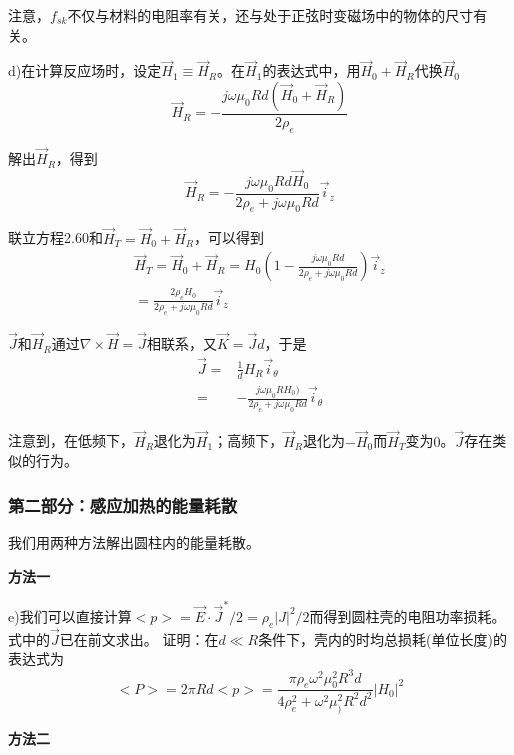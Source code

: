 注意，$f_{sk}$不仅与材料的电阻率有关，还与处于正弦时变磁场中的物体的尺寸有关。

d)在计算反应场时，设定$\vec{H}_1\equiv \vec{H}_R$。在$\vec{H}_1$的表达式中，用$\vec{H}_0+\vec{H}_R$代换$\vec{H}_0$
\begin{equation*}
\vec{H}_R=-\frac{j\omega \mu_0 R d (\vec{H}_0+\vec{H}_R)}{2\rho_e} \tag{S7.7}
\end{equation*}

解出$\vec{H}_R$，得到
\begin{equation*}
\vec{H}_R=-\frac{j\omega \mu_0 R d \vec{H}_0}{2\rho_e+j\omega \mu_0 R d}\vec{i}_z \tag{2.60}
\end{equation*}

联立方程2.60和$\vec{H}_T=\vec{H}_0+\vec{H}_R$，可以得到
\begin{align}
\vec{H}_T=\vec{H}_0+\vec{H}_R=H_0\left(1-\frac{j\omega\mu_0 R d}{2\rho_e+j\omega\mu_0 Rd}\right)\vec{i}_z\nonumber\\
=\frac{2\rho_e H_0}{2\rho_e+j\omega \mu_0 R d}\vec{i}_z\nonumber\tag{2.61}
\end{align}

$\vec{J}$和$\vec{H}_R$通过$\nabla\times \vec{H}=\vec{J}$相联系，又$\vec{K}=\vec{J}d$，于是
\begin{align}
\vec{J}=&\frac{1}{d}H_R \vec{i}_\theta \nonumber\tag{S7.8}\\
=&-\frac{j\omega \mu_0 R H_0)}{2\rho_e+j\omega \mu_0 R d}\vec{i}_\theta\nonumber\tag{2.62}
\end{align}

注意到，在低频下，$\vec{H}_R$退化为$\vec{H}_1$；高频下，$\vec{H}_R$退化为$-\vec{H}_0$而$\vec{H}_T$变为$0$。$\vec{J}$存在类似的行为。

\subsubsection*{第二部分：感应加热的能量耗散}
我们用两种方法解出圆柱内的能量耗散。

\textbf{方法一}

e)我们可以直接计算$<p>=\vec{E}\cdot \vec{J}^* /2=\rho_e |J|^2 /2$而得到圆柱壳的电阻功率损耗。式中的$\vec{J}$已在前文求出。
证明：在$d\ll R$条件下，壳内的时均总损耗(单位长度)的表达式为
\begin{equation}
<P>=2\pi R d<p>=\frac{\pi \rho_e \omega^2 \mu_0^2 R^3 d}{4\rho_e^2+\omega^2\mu_)^2 R^2 d^2} |H_0|^2
\end{equation}

\textbf{方法二}

